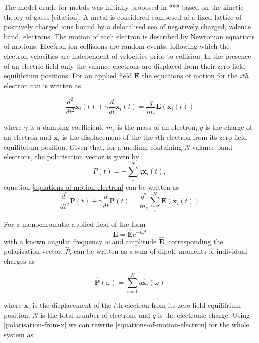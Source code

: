  The model drude for metals was initially proposed in *** based on the kinetic theory of gases [citation]. A metal is considered composed of a fixed lattice of positively charged ions bound by a delocalised sea of negatively charged, valence band, electrons. The motion of each electron is described by Newtonian equations of motions. Electron-ion collisions are random events, following which the electron velocities are independent of velocities prior to collision.
 In the presence of an electric field only the valance electrons are displaced from their zero-field equilibrium positions. For an applied field $\mathbf{E}$ the equations of motion for the $ith$ electron can is written as

\begin{equation}
\frac{d^2}{dt^2}\mathbf{x}_i(t) + \gamma \frac{d}{dt} \mathbf{x}_i(t) = \frac{q}{m_e}\mathbf{E}(\mathbf{x}_i(t))
\label{equations-of-motion-electron}
\end{equation}

where $\gamma$ is a damping coefficient, $m_e$ is the mass of an electron, $q$ is the charge of an electron and $\mathbf{x}_i$ is the displacement of the the $i$th electron from its zero-field equilibrium position. Given that, for a medium containing $N$ valance band electrons, the polarisation vector is given by
$$
P(t) = - \sum_{i}^{N}q\mathbf{x}_i(t),
$$
equation \ref{equations-of-motion-electron} can be written as
\begin{equation}
\frac{d^2}{dt^2}\mathbf{P}(t) + \gamma \frac{d}{dt} \mathbf{P}(t) = \frac{q^2}{m_e} \sum_i^N \mathbf{E}(\mathbf{x}_i(t))
\end{equation}

For a monochromatic applied field of the form
$$
\mathbf{E} = \hat{\mathbf{E}} e^{- i \omega t}
$$
with a known angular frequency $w$ and amplitude $\hat{\mathbf{E}}$, corresponding the polarisation vector, $\hat{P}$, can be written as a sum of dipole moments of individual charges as

\begin{equation}
\hat{\mathbf{P}}(\omega) = \sum_{i=1}^N q \hat{\mathbf{x}}_i(\omega)
\label{polarisation-from-x}
\end{equation}

where $\mathbf{x}_i$ is the displacement of the $i$th electron from its zero-field equilifrium position, $N$ is the total number of electrons and $q$ is the electronic charge. Using \eqref{polarisation-from-x} we can rewrite \eqref{equations-of-motion-electron} for the whole system as

